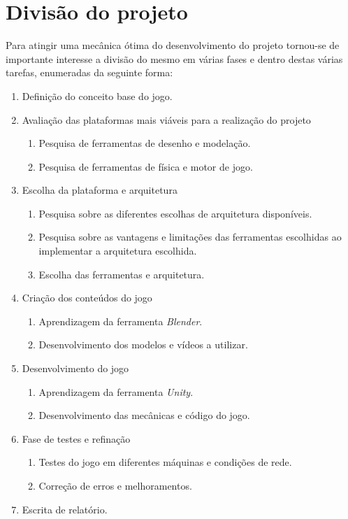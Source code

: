 \section{Divisão do projeto}
\label{sec:DPL}
Para atingir uma mecânica ótima do desenvolvimento do projeto tornou-se de importante interesse a divisão do mesmo em várias fases e dentro destas várias tarefas, enumeradas da seguinte forma:
\begin{enumerate}
\item Definição do conceito base do jogo.\\

\item Avaliação das plataformas mais viáveis para a realização do projeto
\begin{enumerate}
\item Pesquisa de ferramentas de desenho e modelação.
\item Pesquisa de ferramentas de física e motor de jogo.\\
\end{enumerate}


\item Escolha da plataforma e arquitetura
\begin{enumerate}
\item Pesquisa sobre as diferentes escolhas de arquitetura disponíveis.
\item Pesquisa sobre as vantagens e limitações das ferramentas escolhidas ao implementar a arquitetura escolhida.
\item Escolha das ferramentas e arquitetura.\\
\end{enumerate}

\item Criação dos conteúdos do jogo
\begin{enumerate}
\item Aprendizagem da ferramenta \textit{Blender}.
\item Desenvolvimento dos modelos e vídeos a utilizar.\\
\end{enumerate}

\item Desenvolvimento do jogo
\begin{enumerate}
\item Aprendizagem da ferramenta \textit{Unity}.
\item Desenvolvimento das mecânicas e código do jogo.\\
\end{enumerate}

\item Fase de testes e refinação
\begin{enumerate}
\item Testes do jogo em diferentes máquinas e condições de rede.
\item Correção de erros e melhoramentos.\\
\end{enumerate}

\item Escrita de relatório.

\end{enumerate}

